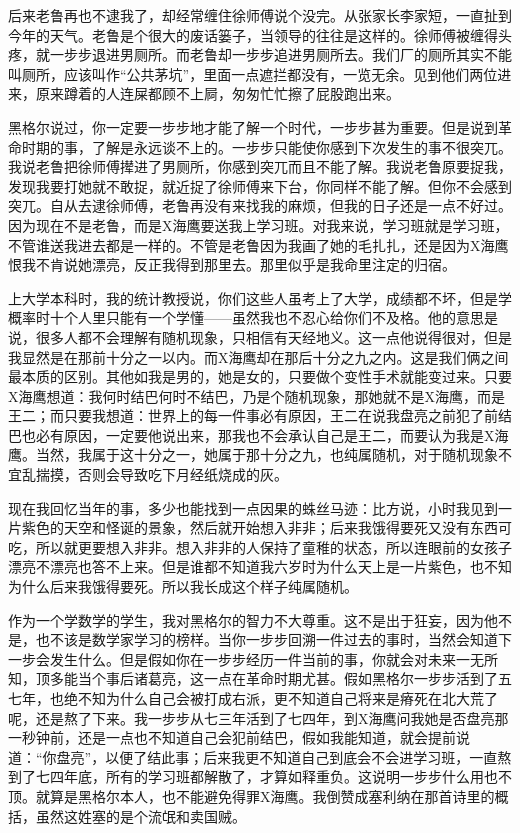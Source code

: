 后来老鲁再也不逮我了，却经常缠住徐师傅说个没完。从张家长李家短，一直扯到今年的天气。老鲁是个很大的废话篓子，当领导的往往是这样的。徐师傅被缠得头疼，就一步步退进男厕所。而老鲁却一步步追进男厕所去。我们厂的厕所其实不能叫厕所，应该叫作“公共茅坑”，里面一点遮拦都没有，一览无余。见到他们两位进来，原来蹲着的人连屎都顾不上屙，匆匆忙忙擦了屁股跑出来。 

黑格尔说过，你一定要一步步地才能了解一个时代，一步步甚为重要。但是说到革命时期的事，了解是永远谈不上的。一步步只能使你感到下次发生的事不很突兀。我说老鲁把徐师傅撵进了男厕所，你感到突兀而且不能了解。我说老鲁原要捉我，发现我要打她就不敢捉，就近捉了徐师傅来下台，你同样不能了解。但你不会感到突兀。自从去逮徐师傅，老鲁再没有来找我的麻烦，但我的日子还是一点不好过。因为现在不是老鲁，而是X海鹰要送我上学习班。对我来说，学习班就是学习班，不管谁送我进去都是一样的。不管是老鲁因为我画了她的毛扎扎，还是因为X海鹰恨我不肯说她漂亮，反正我得到那里去。那里似乎是我命里注定的归宿。 

上大学本科时，我的统计教授说，你们这些人虽考上了大学，成绩都不坏，但是学概率时十个人里只能有一个学懂——虽然我也不忍心给你们不及格。他的意思是说，很多人都不会理解有随机现象，只相信有天经地义。这一点他说得很对，但是我显然是在那前十分之一以内。而X海鹰却在那后十分之九之内。这是我们俩之间最本质的区别。其他如我是男的，她是女的，只要做个变性手术就能变过来。只要X海鹰想道：我何时结巴何时不结巴，乃是个随机现象，那她就不是X海鹰，而是王二；而只要我想道：世界上的每一件事必有原因，王二在说我盘亮之前犯了前结巴也必有原因，一定要他说出来，那我也不会承认自己是王二，而要认为我是X海鹰。当然，我属于这十分之一，她属于那十分之九，也纯属随机，对于随机现象不宜乱揣摸，否则会导致吃下月经纸烧成的灰。 

现在我回忆当年的事，多少也能找到一点因果的蛛丝马迹：比方说，小时我见到一片紫色的天空和怪诞的景象，然后就开始想入非非；后来我饿得要死又没有东西可吃，所以就更要想入非非。想入非非的人保持了童稚的状态，所以连眼前的女孩子漂亮不漂亮也答不上来。但是谁都不知道我六岁时为什么天上是一片紫色，也不知为什么后来我饿得要死。所以我长成这个样子纯属随机。 

作为一个学数学的学生，我对黑格尔的智力不大尊重。这不是出于狂妄，因为他不是，也不该是数学家学习的榜样。当你一步步回溯一件过去的事时，当然会知道下一步会发生什么。但是假如你在一步步经历一件当前的事，你就会对未来一无所知，顶多能当个事后诸葛亮，这一点在革命时期尤甚。假如黑格尔一步步活到了五七年，也绝不知为什么自己会被打成右派，更不知道自己将来是瘠死在北大荒了呢，还是熬了下来。我一步步从七三年活到了七四年，到X海鹰问我她是否盘亮那一秒钟前，还是一点也不知道自己会犯前结巴，假如我能知道，就会提前说道：“你盘亮”，以便了结此事；后来我更不知道自己到底会不会进学习班，一直熬到了七四年底，所有的学习班都解散了，才算如释重负。这说明一步步什么用也不顶。就算是黑格尔本人，也不能避免得罪X海鹰。我倒赞成塞利纳在那首诗里的概括，虽然这姓塞的是个流氓和卖国贼。 

